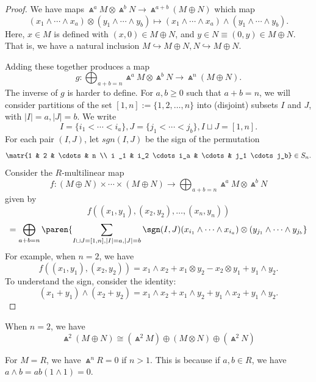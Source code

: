 \begin{proof}
    We have maps $\Wedge ^aM \otimes \Wedge^bN \to \Wedge ^{a+b}(M \oplus N)$ which map
    $$(x_1 \land \cdots \land x_a) \otimes ( y_1 \land \cdots \land y_b) \mapsto (x_1 \land \cdots \land x_a) \land (y_1 \land \cdots \land y_b).$$
    Here, $x \in M$ is defined with $(x,0) \in M \oplus N$, and $y \in N \equiv (0,y) \in M \oplus N$. That is, we have a natural inclusion $M \hookrightarrow M \oplus N, N \hookrightarrow M \oplus N$.

    Adding these together produces a map
    $$g : \bigoplus _{a+b = n}\Wedge^aM \otimes \Wedge ^bN \to \Wedge ^n(M \oplus N).$$
    The inverse of $g$ is harder to define. For $a,b \geq 0$ such that $a+b=n$, we will consider partitions of the set $[1,n] := \{ 1,2,\dots,n\}$ into (disjoint) subsets $I$ and $J$, with $|I| = a, |J|=b$. We write
    $$I = \{ i_1<\cdots <i_a\},J=\{j_1 < \cdots < j_b\},I \sqcup J = [1,n].$$
    For each pair $(I,J)$, let $sgn(I,J)$ be the sign of the permutation
    $$\matr{1 & 2 & \cdots & n \\ i _1 & i_2 \cdots i_a & \cdots & j_1 \cdots j_b} \in S_n.$$
    Consider the $R$-multilinear map
    $$f: ( M \oplus N) \times \cdots \times (M \oplus N) \to \bigoplus_{a+b = n}\Wedge^aM \otimes \Wedge^bN$$
    given by
    $$f((x_1,y_1),(x_2,y_2),\dots,(x_n,y_n))$$
    $$=\bigoplus_{a+b=n}\paren{\sum_{I \sqcup J = [1,n],|I|=a,|J|=b }\sgn(I,J)(x_{i_1}\land \cdots \land x_{i_a})\otimes (y_{j_1} \land \cdots \land y_{j_b}}$$
    For example, when $n=2$, we have
    $$f((x_1,y_1),(x_2,y_2)) = x_1 \land x_2 + x_1 \otimes y_2 - x_2 \otimes y_1 + y_1 \land y_2.$$
    To understand the sign, consider the identity:
    $$(x_1 + y_1)\land (x_2+y_2) = x_1\land x_2 + x_1 \land y_2 + y_1 \land x_2 + y_1 \land y_2.$$
\end{proof}

\begin{ex}
    When $n=2$, we have
    $$\Wedge ^2(M \oplus N) \cong (\Wedge ^2 M) \oplus (M \otimes N) \oplus (\Wedge^2N)$$
\end{ex}

\begin{ex}
    For $M =R$, we have $\Wedge ^nR=0$ if $n >1$. This is because if $a,b \in R$, we have $a \land b = ab(1 \land 1) =0$.
\end{ex}

